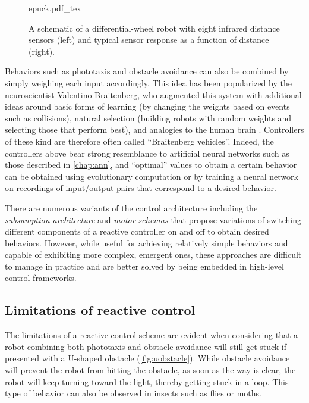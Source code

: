 \begin{figure}
    \centering
    \def\svgwidth{\textwidth}
    {epuck.pdf_tex}
    \caption{A schematic of a differential-wheel robot with eight infrared distance sensors (left) and typical sensor response as a function of distance (right).}
    \label{fig:epuck}
\end{figure}

Behaviors such as phototaxis and obstacle avoidance can also be combined by simply weighing each input accordingly. This idea has been popularized by the neuroscientist Valentino Braitenberg, who augmented this system with additional ideas around basic forms of learning (by changing the weights based on events such as collisions), natural selection (building robots with random weights and selecting those that perform best), and analogies to the human brain \cite{braitenberg1986vehicles}. Controllers of these kind are therefore often called ``Braitenberg vehicles''.
%
Indeed, the controllers above bear strong resemblance to artificial neural networks such as those described in \cref{chap:ann}, and ``optimal'' values to obtain a certain behavior can be obtained using evolutionary computation \cite{floreano1998evolutionary} or by training a neural network on recordings of input/output pairs that correspond to a desired behavior.

There are numerous variants of the control architecture including the \textsl{subsumption architecture} \cite{brooks1990elephants} and \textsl{motor schemas} \cite{arkin1989motor} that propose variations of switching different components of a reactive controller on and off to obtain desired behaviors.
However, while useful for achieving relatively simple behaviors and capable of exhibiting more complex, emergent ones, these approaches are difficult to manage in practice and are better solved by being embedded in high-level control frameworks.

\subsection{Limitations of reactive control}

The limitations of a reactive control scheme are evident when considering that a robot combining both phototaxis and obstacle avoidance will still get stuck if presented with a U-shaped obstacle (\cref{fig:uobstacle}). While obstacle avoidance will prevent the robot from hitting the obstacle, as soon as the way is clear, the robot will keep turning toward the light, thereby getting stuck in a loop. This type of behavior can also be observed in insects such as flies or moths.

